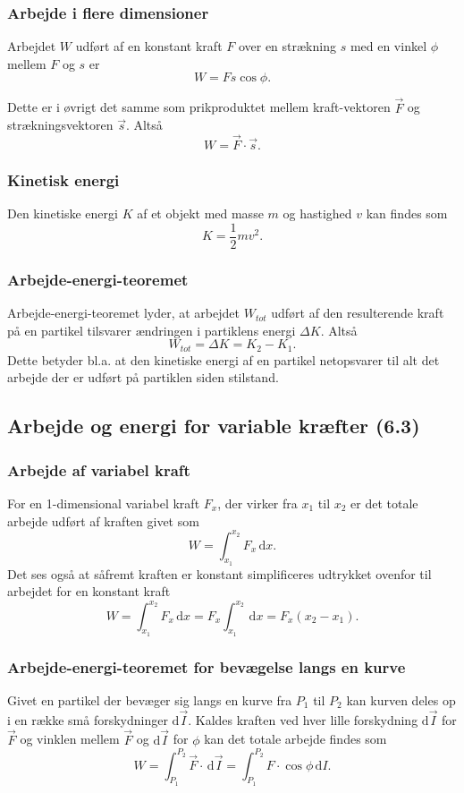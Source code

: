\subsubsection{Arbejde i flere dimensioner} \label{afs:w2d}
Arbejdet $W$ udført af en konstant kraft $F$ over en strækning $s$ med en vinkel $\phi$ mellem $F$ og $s$ er
\[ 
W = Fs \cos\phi
.\]

Dette er i øvrigt det samme som prikproduktet mellem kraft-vektoren $\Vec{F}$ og strækningsvektoren $\Vec{s}$. Altså
\[ 
W = \Vec{F} \cdot \Vec{s}
.\]

\subsubsection{Kinetisk energi} \label{afs:enkin} 
Den kinetiske energi $K$ af et objekt med masse $m$ og hastighed $v$ kan findes som
\[ 
K = \frac{1}{2}mv^2
.\]


\subsubsection{Arbejde-energi-teoremet} \label{afs:wetheo}
Arbejde-energi-teoremet lyder, at arbejdet $W_{tot}$ udført af den resulterende kraft på en partikel tilsvarer ændringen i partiklens energi $\Delta K$. Altså
\[ 
W_{tot} = \Delta K = K_2 - K_1
.\]
Dette betyder bl.a. at den kinetiske energi af en partikel netopsvarer til alt det arbejde der er udført på partiklen siden stilstand.


\subsection{Arbejde og energi for variable kræfter (6.3)}

\subsubsection{Arbejde af variabel kraft} \label{afs:wvf}
For en 1-dimensional variabel kraft $F_x$, der virker fra $x_1$ til $x_2$ er det totale arbejde udført af kraften givet som
\[ 
W = \int_{x_1}^{x_2} F_x \, \mathrm{d}x
.\]
Det ses også at såfremt kraften er konstant simplificeres udtrykket ovenfor til arbejdet for en konstant kraft
\[ 
W = \int_{x_1}^{x_2} F_x \, \mathrm{d}x = F_x \int_{x_1}^{x_2} \, \mathrm{d}x = F_x(x_2-x_1)
.\]

\subsubsection{Arbejde-energi-teoremet for bevægelse langs en kurve} \label{afs:wetheocur}
Givet en partikel der bevæger sig langs en kurve fra $P_1$ til $P_2$ kan kurven deles op i en række små forskydninger $\mathrm{d}\Vec{I}$. Kaldes kraften ved hver lille forskydning $\mathrm{d}\Vec{I}$ for $\Vec{F}$ og vinklen mellem $\Vec{F}$ og $\mathrm{d}\Vec{I}$ for $\phi$ kan det totale arbejde findes som
\[ 
W = \int_{P_1}^{P_2} \Vec{F} \cdot \, \mathrm{d}\Vec{I} = \int_{P_1}^{P_2} F \cdot \cos\phi \, \mathrm{d}I
.\]

